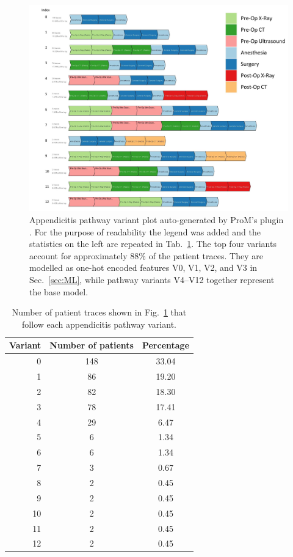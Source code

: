 \begin{figure}[t]
\hspace{-2cm}
\includegraphics[width=1.5\textwidth]{images/appendicitis_variant_index_anes.jpg}
\caption{Appendicitis pathway variant plot auto-generated by ProM's
  plugin . 
  For the purpose of readability the legend was added and the
  statistics on the left are repeated in Tab.~\ref{table:appendicitis variant table}.
 The top four variants account for approximately 88\% of the patient
 traces. They are modelled as one-hot encoded features V0, V1, V2, and V3
 in Sec.~\ref{sec:ML}, while pathway variants V4--V12 together represent
 the base model.
 }
\label{fig:appendicitis pathway variants}
\end{figure}
\clearpage

\begin{table}[t]
\centering
\caption{Number of patient traces shown in Fig.~\ref{fig:appendicitis pathway variants} that follow each appendicitis pathway variant.}
\label{table:appendicitis variant table}
\begin{tabular}{ r c c }
 \hline
 \hline
 Variant & Number of patients & Percentage \\ 
 \hline
 0 & 148 & 33.04\\ 
 1 & 86 & 19.20\\ 
 2 & 82 & 18.30\\ 
 3 & 78 & 17.41\\ 
 4 & 29 & 6.47\\ 
 5 & 6 & 1.34\\
 6 & 6 & 1.34\\ 
 7 & 3 & 0.67\\ 
 8 & 2 & 0.45\\ 
 9 & 2 & 0.45\\ 
 10 & 2 & 0.45\\ 
 11 & 2 & 0.45\\ 
 12 & 2 & 0.45\\ 
 \hline
 \hline
\end{tabular}
\end{table}


